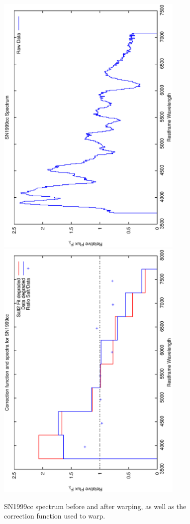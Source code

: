 \clearpage

\begin{figure}[p]
\centering
\includegraphics[angle=-90,width=0.8\textwidth]{./figures/spectrabeforeafter/SN1999cc_handpicked_v001_v027_before_after_spectra.ps}
\hfill
\includegraphics[angle=-90,width=0.8\textwidth]{./figures/corrections/SN1999cc_v001_correction.ps}
\hfill
\caption{SN1999cc spectrum before and after warping, as well as the correction function used to warp.}
\label{fig:SN1999ccfour1}
\end{figure}

